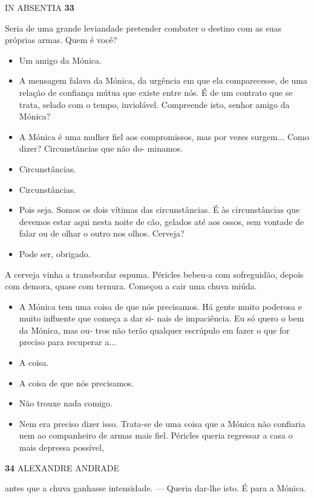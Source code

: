 IN ABSENTIA \textbf{33}

Seria de uma grande leviandade pretender combater o destino com as suas
próprias armas. Quem é você?

\begin{itemize}
\tightlist
\item
  Um amigo da Mónica.
\item
  A mensagem falava da Mónica, da urgência em que ela comparecesse, de
  uma relação de confiança mútua que existe entre nós. É de um contrato
  que se trata, selado com o tempo, inviolável. Compreende isto, senhor
  amigo da Mónica?
\item
  A Mónica é uma mulher fiel aos compromissos, mas por vezes surgem...
  Como dizer? Circunstâncias que não do- minamos.
\item
  Circunstâncias.
\item
  Circunstâncias.
\item
  Pois seja. Somos os dois vítimas das circunstâncias. É às
  circunstâncias que devemos estar aqui nesta noite de cão, gelados até
  aos ossos, sem vontade de falar ou de olhar o outro nos olhos.
  Cerveja?
\item
  Pode ser, obrigado.
\end{itemize}

A cerveja vinha a transbordar espuma. Péricles bebeu-a com sofreguidão,
depois com demora, quase com ternura. Começou a cair uma chuva miúda.

\begin{itemize}
\tightlist
\item
  A Mónica tem uma coisa de que nós precisamos. Há gente muito poderosa
  e muito influente que começa a dar si- nais de impaciência. Eu só
  quero o bem da Mónica, mas ou- tros não terão qualquer escrúpulo em
  fazer o que for preciso para recuperar a...
\item
  A coisa.
\item
  A coisa de que nós precisamos.
\item
  Não trouxe nada comigo.
\item
  Nem era preciso dizer isso. Trata-se de uma coisa que a Mónica não
  confiaria nem ao companheiro de armas mais fiel. Péricles queria
  regressar a casa o mais depressa possível,
\end{itemize}

\textbf{34 }ALEXANDRE ANDRADE

antes que a chuva ganhasse intensidade. --- Queria dar-lhe isto. É para
a Mónica.

